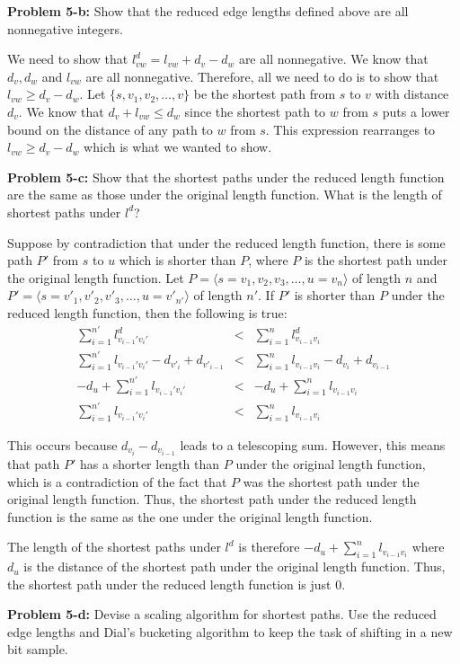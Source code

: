 \documentclass[psamsfonts]{amsart}
\newenvironment{sol}{\vspace{0.25cm}{\large \bfseries Solution:}}{\qedsymbol}
\newenvironment{prob}[1]{\begin{framed}{\large \bfseries Problem #1:}}{\end{framed}}
\begin{document}
\begin{prob}{5-b}
Show that the reduced edge lengths defined above are all nonnegative integers.
\end{prob}
\begin{sol}
We need to show that $l_{vw}^d = l_{vw} + d_v - d_w$ are all nonnegative. We know that $d_v, d_w$ and $l_{vw}$ are all nonnegative. Therefore, all we need to do is to show that $l_{vw} \geq d_v - d_w$. Let $\{s, v_1, v_2, \ldots, v\}$ be the shortest path from $s$ to $v$ with distance $d_v$. We know that $d_v + l_{vw} \leq d_{w}$ since the shortest path to $w$ from $s$ puts a lower bound on the distance of any path to $w$ from $s$. This expression rearranges to $l_{vw} \geq d_v - d_w$ which is what we wanted to show.
\end{sol}

\begin{prob}{5-c}
Show that the shortest paths under the reduced length function are the same as those under the original length function. What is the length of shortest paths under $l^d$?
\end{prob}
\begin{sol}
Suppose by contradiction that under the reduced length function, there is some path $P'$ from $s$ to $u$ which is shorter than $P$, where $P$ is the shortest path under the original length function. Let $P = \langle s=v_1, v_2, v_3, \ldots, u=v_n \rangle$ of length $n$ and $P' = \langle s=v'_1, v'_2, v'_3, \ldots, u = v'_{n'}\rangle$ of length $n'$. If $P'$ is shorter than $P$ under the reduced length function, then the following is true:
\begin{eqnarray}
\sum_{i=1}^{n'} l^d_{v_{i-1}' v_{i}'} &<& \sum_{i=1}^n l^d_{v_{i-1} v_i} \\
\sum_{i=1}^{n'} l_{v_{i-1}' v_{i}'} - d_{v'_i} + d_{v'_{i-1}} &<& \sum_{i=1}^{n} l_{v_{i-1} v_{i}} - d_{v_i} + d_{v_{i-1}} \\
-d_{u} + \sum_{i=1}^{n'} l_{v_{i-1}' v_i'} &<& -d_u + \sum_{i=1}^n l_{v_{i-1} v_i} \\
\sum_{i=1}^{n'} l_{v_{i-1}' v_i'} &<& \sum_{i=1}^n l_{v_{i-1} v_i} 
\end{eqnarray}

This occurs because $d_{v_i} - d_{v_{i-1}}$ leads to a telescoping sum. However, this means that path $P'$ has a shorter length than $P$ under the original length function, which is a contradiction of the fact that $P$ was the shortest path under the original length function. Thus, the shortest path under the reduced length function is the same as the one under the original length function.

The length of the shortest paths under $l^d$ is therefore $-d_u + \sum_{i=1}^n l_{v_{i-1} v_{i}}$ where $d_u$ is the distance of the shortest path under the original length function. Thus, the shortest path under the reduced length function is just 0. 
\end{sol}

\begin{prob}{5-d}
Devise a scaling algorithm for shortest paths. Use the reduced edge lengths and Dial's bucketing algorithm to keep the task of shifting in a new bit sample.
\end{prob}
\begin{sol}

\end{sol}
\end{document}
